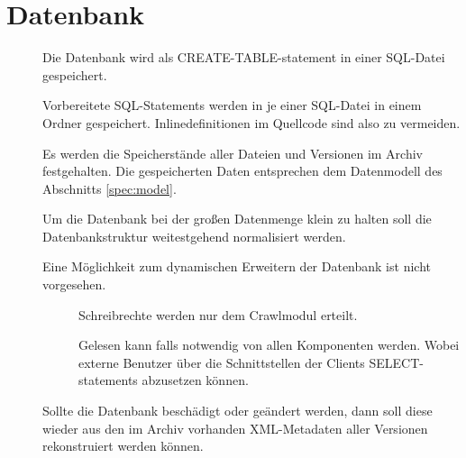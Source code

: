 \section{Datenbank} \label{spec:db}
\begin{description}
	\item []
		Die Datenbank wird als CREATE-TABLE-statement in einer SQL-Datei gespeichert.
	\item []
		Vorbereitete SQL-Statements werden in je einer SQL-Datei in einem Ordner gespeichert.
		Inlinedefinitionen im Quellcode sind also zu vermeiden.
	\item []
		Es werden die Speicherstände aller Dateien und Versionen im Archiv festgehalten.
        Die gespeicherten Daten entsprechen dem Datenmodell des Abschnitts \ref{spec:model}.
	\item []
		Um die Datenbank bei der großen Datenmenge klein zu halten soll die Datenbankstruktur
		weitestgehend normalisiert werden.
	\item [] 
		Eine Möglichkeit zum dynamischen Erweitern der Datenbank ist nicht vorgesehen.
	\item []
		\begin{description}
			\item [] Schreibrechte werden nur dem Crawlmodul erteilt.
			\item [] Gelesen kann falls notwendig von allen Komponenten werden.
				Wobei externe Benutzer über die Schnittstellen der Clients SELECT-statements abzusetzen können.
		\end{description}
	\item []
		Sollte die Datenbank beschädigt oder geändert werden, dann soll diese wieder aus den
		im Archiv vorhanden XML-Metadaten aller Versionen rekonstruiert werden können.
\end{description}
